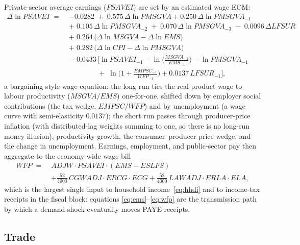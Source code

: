 Private-sector average earnings ($PSAVEI$) are set by an estimated wage ECM:
\begin{equation}
\begin{aligned}
\Delta \ln PSAVEI \;=\;& -0.0282 \;+\; 0.575\,\Delta \ln PMSGVA + 0.250\,\Delta \ln PMSGVA_{-1} \\
&+\; 0.105\,\Delta \ln PMSGVA_{-2} \;+\; 0.070\,\Delta \ln PMSGVA_{-3} \;-\; 0.0096\,\Delta LFSUR \\
&+\; 0.264\,\big(\Delta \ln MSGVA - \Delta \ln EMS\big) \\
&+\; 0.282\,\big(\Delta \ln CPI - \Delta \ln PMSGVA\big) \\
&-\; 0.0433\,\Big[ \ln PSAVEI_{-1} - \ln\!\big(\tfrac{MSGVA_{-1}}{EMS_{-1}}\big) - \ln PMSGVA_{-1} \\
&\qquad\qquad +\; \ln\!\big(1 + \tfrac{EMPSC_{-1}}{WFP_{-1}}\big) + 0.0137\,LFSUR_{-1} \Big],
\end{aligned}
\label{eq:wage}
\end{equation}
a bargaining-style wage equation: the long run ties the real product wage to labour productivity ($MSGVA/EMS$) one-for-one, shifted down by employer social contributions (the tax wedge, $EMPSC/WFP$) and by unemployment (a wage curve with semi-elasticity $0.0137$); the short run passes through producer-price inflation (with distributed-lag weights summing to one, so there is no long-run money illusion), productivity growth, the consumer--producer price wedge, and the change in unemployment. Earnings, employment, and public-sector pay then aggregate to the economy-wide wage bill
\begin{equation}
\begin{aligned}
WFP \;=\;& ADJW \cdot PSAVEI \cdot (EMS - ESLFS) \\
&+ \tfrac{52}{4000}\,CGWADJ \cdot ERCG \cdot ECG + \tfrac{52}{4000}\,LAWADJ \cdot ERLA \cdot ELA,
\end{aligned}
\label{eq:wfp}
\end{equation}
which is the largest single input to household income~\eqref{eq:hhdi} and to income-tax receipts in the fiscal block: equations \eqref{eq:ems}--\eqref{eq:wfp} are the transmission path by which a demand shock eventually moves PAYE receipts.

\subsection{Trade}
\label{sec:trade}

